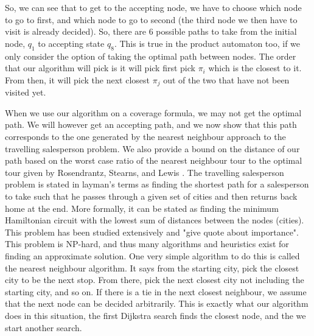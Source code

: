 So, we can see that to get to the accepting node, we have to choose which node to go to first, and which node to go to second (the third node we then have to visit is already decided). So, there are 6 possible paths to take from the initial node, $q_1$ to accepting state $q_8$. This is true in the product automaton too, if we only consider the option of taking the optimal path between nodes. The order that our algorithm will pick is it will pick first pick $\pi_i$ which is the closest to it. From then, it will pick the next closest $\pi_j$ out of the two that have not been visited yet.



When we use our algorithm on a coverage formula, we may not get the optimal path. We will however get an accepting path, and we now show that this path corresponds to the one generated by the nearest neighbour approach to the travelling salesperson problem. We also provide a bound on the distance of our path based on the worst case ratio of the nearest neighbour tour to the optimal tour given by Rosendrantz, Stearns, and Lewis \cite{rosenkrantz74}. The travelling salesperson problem is stated in layman's terms as finding the shortest path for a salesperson to take such that he passes through a given set of cities and then returns back home at the end. More formally, it can be stated as finding the minimum Hamiltonian circuit with the lowest sum of distances between the nodes (cities). This problem has been studied extensively and "give quote about importance". This problem is NP-hard, and thus many algorithms and heuristics exist for finding an approximate solution. One very simple algorithm to do this is called the nearest neighbour algorithm. It says from the starting city, pick the closest city to be the next stop. From there, pick the next closest city not including the starting city, and so on. If there is a tie in the next closest neighbour, we assume that the next node can be decided arbitrarily. This is exactly what our algorithm does in this situation, the first Dijkstra search finds the closest node, and the we start another search. 

